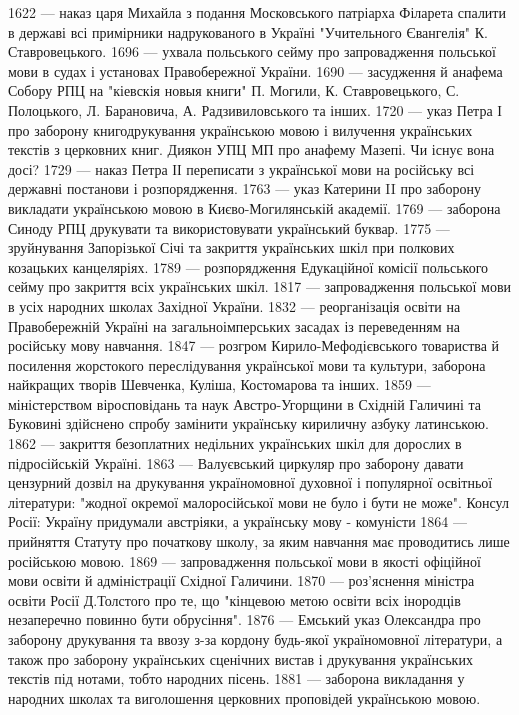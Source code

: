 1622 — наказ царя Михайла з подання Московського патріарха Філарета спалити в державі всі примірники надрукованого в Україні "Учительного Євангелія" К. Ставровецького.
1696 — ухвала польського сейму про запровадження польської мови в судах і установах Правобережної України.
1690 — засудження й анафема Собору РПЦ на "кіевскія новыя книги" П. Могили, К. Ставровецького, С. Полоцького, Л. Барановича, А. Радзивиловського та інших.
1720 — указ Петра І про заборону книгодрукування українською мовою і вилучення українських текстів з церковних книг.
Диякон УПЦ МП про анафему Мазепі. Чи існує вона досі?
1729 — наказ Петра ІІ переписати з української мови на російську всі державні постанови і розпорядження.
1763 — указ Катерини II про заборону викладати українською мовою в Києво-Могилянській академії.
1769 — заборона Синоду РПЦ друкувати та використовувати український буквар.
1775 — зруйнування Запорізької Січі та закриття українських шкіл при полкових козацьких канцеляріях.
1789 — розпорядження Едукаційної комісії польського сейму про закриття всіх українських шкіл.
1817 — запровадження польської мови в усіх народних школах Західної України.
1832 — реорганізація освіти на Правобережній Україні на загальноімперських засадах із переведенням на російську мову навчання.
1847 — розгром Кирило-Мефодієвського товариства й посилення жорстокого переслідування української мови та культури, заборона найкращих творів Шевченка, Куліша, Костомарова та інших.
1859 — міністерством віросповідань та наук Австро-Угорщини в Східній Галичині та Буковині здійснено спробу замінити українську кириличну азбуку латинською.
1862 — закриття безоплатних недільних українських шкіл для дорослих в підросійській Україні.
1863 — Валуєвський циркуляр про заборону давати цензурний дозвіл на друкування україномовної духовної і популярної освітньої літератури: "жодної окремої малоросійської мови не було і бути не може".
Консул Росії: Україну придумали австріяки, а українську мову - комуністи
1864 — прийняття Статуту про початкову школу, за яким навчання має проводитись лише російською мовою.
1869 — запровадження польської мови в якості офіційної мови освіти й адміністрації Східної Галичини.
1870 — роз'яснення міністра освіти Росії Д.Толстого про те, що "кінцевою метою освіти всіх інородців незаперечно повинно бути обрусіння".
1876 — Емський указ Олександра  про заборону друкування та ввозу з-за кордону будь-якої україномовної літератури, а також про заборону українських сценічних вистав і друкування українських текстів під нотами, тобто народних пісень.
1881 — заборона викладання у народних школах та виголошення церковних проповідей українською мовою.
